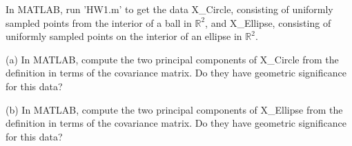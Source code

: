 \documentclass[10pt]{article}
\newenvironment{problem}[2][]{\begin{trivlist}
\item[\hskip \labelsep {\bfseries #1}\hskip \labelsep {\bfseries #2.}]}{\end{trivlist}}
\begin{document}
\begin{problem}{Question 5}

In MATLAB, run 'HW1.m' to get the data X\_Circle, consisting of uniformly sampled points from the interior of a ball in $\mathbb{R}^2$, and X\_Ellipse, consisting of uniformly sampled points on the interior of an ellipse in $\mathbb{R}^2$.

(a) In MATLAB, compute the two principal components of X\_Circle from the definition in terms of the covariance matrix. Do they have geometric significance for this data?

(b) In MATLAB, compute the two principal components of X\_Ellipse from the definition in terms of the covariance matrix. Do they have geometric significance for this data?

\end{problem}
\end{document}
